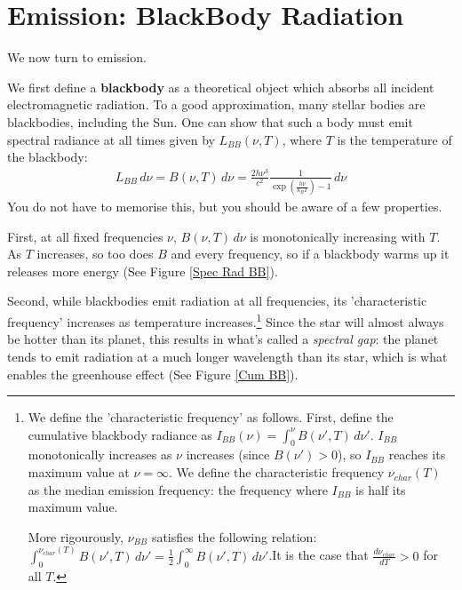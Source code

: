 \section{Emission: BlackBody Radiation}

We now turn to emission.

We first define a \textbf{blackbody} as a theoretical object which absorbs all incident electromagnetic radiation. To a good approximation, many stellar bodies are blackbodies, including the Sun. One can show that such a body must emit spectral radiance at all times given by $L_{BB}(\nu,T)$, where $T$ is the temperature of the blackbody:
\begin{align}
    \boxed{L_{BB}\,d\nu=B(\nu,T)\,d\nu=\frac{2h\nu^3}{c^2}\frac{1}{\exp\left( \frac{h\nu}{k_BT} \right)-1}\,d\nu}
\end{align}
You do not have to memorise this, but you should be aware of a few properties. 

First, at all fixed frequencies $\nu$, $B(\nu,T)\,d\nu$ is monotonically increasing with $T$. As $T$ increases, so too does $B$ and every frequency, so if a blackbody warms up it releases more energy (See Figure \ref{Spec Rad BB}).

Second, while blackbodies emit radiation at all frequencies, its 'characteristic frequency' increases as temperature increases.\footnote{
    We define the 'characteristic frequency' as follows. First, define the cumulative blackbody radiance as $I_{BB}(\nu)=\int_0^\nu B(\nu',T)\,d\nu'$. $I_{BB}$ monotonically increases as $\nu$ increases (since $B(\nu')>0$), so $I_{BB}$ reaches its maximum value at $\nu=\infty$. We define the characteristic frequency $\nu_{char}(T)$ as the median emission frequency: the frequency where $I_{BB}$ is half its maximum value. 
    
    More rigourously, $\nu_{BB}$ satisfies the following relation: $\int_0^{\nu_{char}(T)} B(\nu',T)\,d\nu'=\frac{1}{2}\int_0^\infty B(\nu',T)\,d\nu'$.\footnotemark  It is the case that $\frac{d\nu_{char}}{dT}>0$ for all $T$.
} 
Since the star will almost always be hotter than its planet, this results in what's called a \textit{spectral gap}: the planet tends to emit radiation at a much longer wavelength than its star, which is what enables the greenhouse effect (See Figure \ref{Cum BB}).

